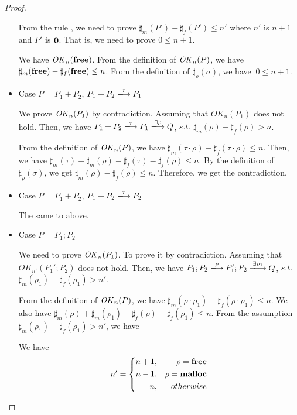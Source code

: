 \begin{proof}
\begin{itemize}
From the rule , we need to prove \(\sharp_{m}(P') -
\sharp_{f}(P') \le n'\) where \(n'\) is \(n + 1\) and \(P'\) is \(\bf
0\). That is, we need to prove \( 0 \le n + 1\).

We have \(\mathit{OK}_{n}(\mathbf{free})\). From the definition of \(\mathit{OK}_n(P)\), we
have \(\sharp_{m}(\mathbf{free}) - \sharp_{f}(\mathbf{free}) \le n\). From the
definition of \(\sharp_{\rho}(\sigma)\), we have \( \ 0 \le n+1\).

\item Case $P = P_{1} + P_{2}$, \Rtab \(P_1 + P_2 \xlongrightarrow{\tau} P_1\)

  We prove \(\mathit{OK}_n(P_1)\) by contradiction.  Assuming that
  \(OK_{n}(P_1)\) does not hold.  Then, we have \(P_{1} + P_{2}
  \xlongrightarrow{\tau} P_{1} \xlongrightarrow{\exists \rho} Q\),
  \(s.t.\) \(\sharp_{m}(\rho) - \sharp_{f}(\rho) > n\).

  From the definition of \(\mathit{OK}_n(P)\),
  we have \(\sharp_m(\tau \cdot \rho) -\sharp_f(\tau \cdot \rho) \le
  n\). Then, we have \(\sharp_m(\tau) + \sharp_m(\rho) -
  \sharp_f(\tau) -\sharp_f(\rho) \le n\).  By the definition of
  \(\sharp_\rho(\sigma)\),  we get \(\sharp_m(\rho) -\sharp_f(\rho)
  \le n\). Therefore, we get the contradiction.

\item Case $P = P_{1} + P_{2}$, \Rtab \(P_1 + P_2 \xlongrightarrow{\tau} P_2\)

 The same to above.

\item Case $P = P_{1};P_{2}$

  We need to prove \(\mathit{OK}_n(P_1)\).  To prove it by contradiction.
  Assuming that \(OK_{n'}(P_{1}';P_{2})\) does not hold. Then, we have
  \(P_{1};P_{2} \xlongrightarrow{\rho} P_{1}';P_{2}
  \xlongrightarrow{\exists \rho_1} Q\), \(s.t.\) \(\sharp_{m}(\rho_1)
  - \sharp_{f}(\rho_1) > n'\).

  From the definition of \(\mathit{OK}_n(P)\), we have \( \sharp_{m}(\rho
  \cdot \rho_1) - \sharp_{f}(\rho \cdot \rho_1) \le n\).  We also have
  \(\sharp_{m}(\rho) + \sharp_{m}(\rho_1) - \sharp_{f}(\rho)
  -\sharp_{f}(\rho_1) \le n\).  From the assumption
  \(\sharp_{m}(\rho_1) - \sharp_{f}(\rho_1) > n'\), we have 

We have
$$
   n'=\left\{
   \begin{aligned}
     n + 1, && \rho = \mathbf{free} \\
     n - 1,  && \rho = \mathbf{malloc}  \\
     n ,      && otherwise
   \end{aligned}
   \right.
$$


\end{itemize}
\end{proof}
